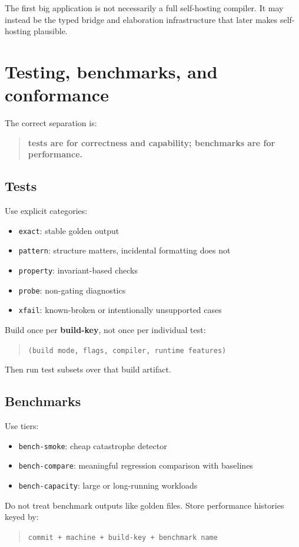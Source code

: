 \documentclass[11pt]{article}
\begin{document}
The first big application is not necessarily a full self-hosting compiler. It may instead be the typed bridge and elaboration infrastructure that later makes self-hosting plausible.

\section{Testing, benchmarks, and conformance}
The correct separation is:
\begin{quote}
\textbf{tests are for correctness and capability; benchmarks are for performance.}
\end{quote}

\subsection{Tests}
Use explicit categories:
\begin{itemize}
  \item \texttt{exact}: stable golden output
  \item \texttt{pattern}: structure matters, incidental formatting does not
  \item \texttt{property}: invariant-based checks
  \item \texttt{probe}: non-gating diagnostics
  \item \texttt{xfail}: known-broken or intentionally unsupported cases
\end{itemize}

Build once per \textbf{build-key}, not once per individual test:
\begin{quote}
\texttt{(build mode, flags, compiler, runtime features)}
\end{quote}
Then run test subsets over that build artifact.

\subsection{Benchmarks}
Use tiers:
\begin{itemize}
  \item \texttt{bench-smoke}: cheap catastrophe detector
  \item \texttt{bench-compare}: meaningful regression comparison with baselines
  \item \texttt{bench-capacity}: large or long-running workloads
\end{itemize}

Do not treat benchmark outputs like golden files. Store performance histories keyed by:
\begin{quote}
\texttt{commit + machine + build-key + benchmark name}
\end{quote}
\end{document}
